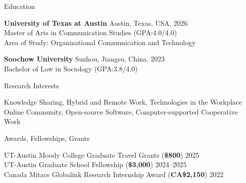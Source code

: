 \documentclass[
	11pt, %
]{resume} %
\begin{document}

\begin{rSection}{Education}
	
	\textbf{University of Texas at Austin} \hfill Austin, Texas, USA, 2026 \\ 
	Master of Arts in Communication Studies (GPA:4.0/4.0) \\
	Area of Study: Organizational Communication and Technology 

    \textbf{Soochow University} \hfill Suzhou, Jiangsu, China, 2023 \\
	Bachelor of Law in Sociology (GPA:3.8/4.0) 
	
\end{rSection}

\begin{rSection}{Research Interests}

Knowledge Sharing, Hybrid and Remote Work, Technologies in the Workplace\\
Online Community, Open-source Software, Computer-supported Cooperative Work 

\end{rSection}


\begin{rSection}{Awards, Fellowships, Grants}
	
	UT-Austin Moody College Graduate Travel Grants (\textbf{\$800})  \hfill 2025\\
	UT-Austin Graduate School Fellowship   (\textbf{\$3,000})  \hfill 2024--2025\\
    Canada Mitacs Globalink Research Internship Award     (\textbf{CA\$2,150})  \hfill 2022
	
\end{rSection}

\end{document}
